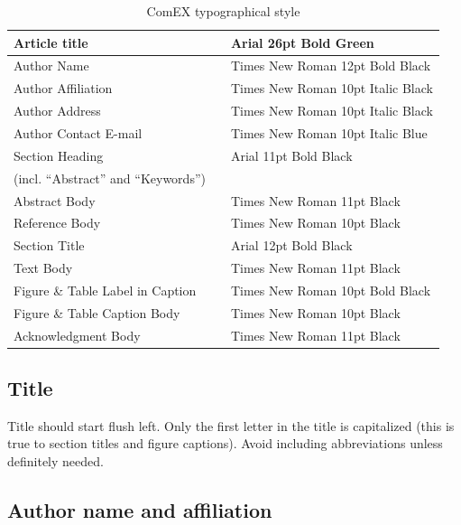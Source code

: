 \documentclass{comex}
\begin{document}
\begin{table}[ht]
\begin{center}
\caption{ComEX typographical style} \label{tab:style}
\begin{small}
\begin{tabular}{lcl}
\hline
Article title & \quad &  Arial 26pt Bold Green\\
\hline
Author Name & \quad & Times New Roman 12pt Bold Black\\
\hline
Author Affiliation & \quad & Times New Roman 10pt Italic Black\\
\hline
Author Address & \quad & Times New Roman 10pt Italic Black\\
\hline
Author Contact E-mail & \quad & Times New Roman 10pt Italic Blue\\
\hline
Section Heading & \quad & Arial 11pt Bold Black\\
(incl. ``Abstract'' and ``Keywords'') & & \\
\hline
Abstract Body & \quad & Times New Roman 11pt Black\\
\hline
Reference Body & \quad & Times New Roman 10pt Black\\
\hline
Section Title & \quad & Arial 12pt Bold Black\\
\hline
Text Body & \quad & Times New Roman 11pt Black\\
\hline
Figure \& Table Label in Caption & \quad & Times New Roman 10pt Bold Black\\
\hline
Figure \& Table Caption Body & \quad & Times New Roman 10pt Black\\
\hline
Acknowledgment Body & \quad & Times New Roman 11pt Black\\
\hline
\end{tabular}
\end{small}
\end{center}
\end{table}


\subsection{Title}

Title should start flush left. Only the first letter in the title is
capitalized (this is true to section titles and figure captions).
Avoid including abbreviations unless definitely needed.

\subsection{Author name and affiliation}
\end{document}
